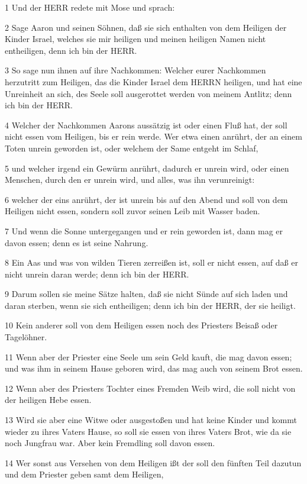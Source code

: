 \par 1 Und der HERR redete mit Mose und sprach:
\par 2 Sage Aaron und seinen Söhnen, daß sie sich enthalten von dem Heiligen der Kinder Israel, welches sie mir heiligen und meinen heiligen Namen nicht entheiligen, denn ich bin der HERR.
\par 3 So sage nun ihnen auf ihre Nachkommen: Welcher eurer Nachkommen herzutritt zum Heiligen, das die Kinder Israel dem HERRN heiligen, und hat eine Unreinheit an sich, des Seele soll ausgerottet werden von meinem Antlitz; denn ich bin der HERR.
\par 4 Welcher der Nachkommen Aarons aussätzig ist oder einen Fluß hat, der soll nicht essen vom Heiligen, bis er rein werde. Wer etwa einen anrührt, der an einem Toten unrein geworden ist, oder welchem der Same entgeht im Schlaf,
\par 5 und welcher irgend ein Gewürm anrührt, dadurch er unrein wird, oder einen Menschen, durch den er unrein wird, und alles, was ihn verunreinigt:
\par 6 welcher der eins anrührt, der ist unrein bis auf den Abend und soll von dem Heiligen nicht essen, sondern soll zuvor seinen Leib mit Wasser baden.
\par 7 Und wenn die Sonne untergegangen und er rein geworden ist, dann mag er davon essen; denn es ist seine Nahrung.
\par 8 Ein Aas und was von wilden Tieren zerreißen ist, soll er nicht essen, auf daß er nicht unrein daran werde; denn ich bin der HERR.
\par 9 Darum sollen sie meine Sätze halten, daß sie nicht Sünde auf sich laden und daran sterben, wenn sie sich entheiligen; denn ich bin der HERR, der sie heiligt.
\par 10 Kein anderer soll von dem Heiligen essen noch des Priesters Beisaß oder Tagelöhner.
\par 11 Wenn aber der Priester eine Seele um sein Geld kauft, die mag davon essen; und was ihm in seinem Hause geboren wird, das mag auch von seinem Brot essen.
\par 12 Wenn aber des Priesters Tochter eines Fremden Weib wird, die soll nicht von der heiligen Hebe essen.
\par 13 Wird sie aber eine Witwe oder ausgestoßen und hat keine Kinder und kommt wieder zu ihres Vaters Hause, so soll sie essen von ihres Vaters Brot, wie da sie noch Jungfrau war. Aber kein Fremdling soll davon essen.
\par 14 Wer sonst aus Versehen von dem Heiligen ißt der soll den fünften Teil dazutun und dem Priester geben samt dem Heiligen,
